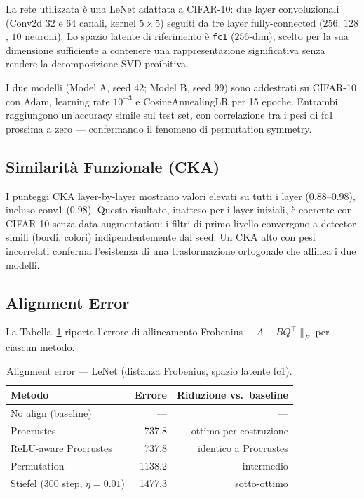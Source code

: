 \documentclass[11pt, a4paper]{article}
\begin{document}
La rete utilizzata è una LeNet adattata a CIFAR-10: due layer convoluzionali (Conv2d 32 e 64 canali, kernel $5\times5$) seguiti da tre layer fully-connected ($256$, $128$, $10$ neuroni). Lo spazio latente di riferimento è \texttt{fc1} ($256$-dim), scelto per la sua dimensione sufficiente a contenere una rappresentazione significativa senza rendere la decomposizione SVD proibitiva.

I due modelli (Model A, seed 42; Model B, seed 99) sono addestrati su CIFAR-10 con Adam, learning rate $10^{-3}$ e CosineAnnealingLR per 15 epoche. Entrambi raggiungono un'accuracy simile sul test set, con correlazione tra i pesi di fc1 prossima a zero — confermando il fenomeno di permutation symmetry.

\subsection{Similarità Funzionale (CKA)}

I punteggi CKA layer-by-layer mostrano valori elevati su tutti i layer ($0.88$–$0.98$), incluso conv1 ($0.98$). Questo risultato, inatteso per i layer iniziali, è coerente con CIFAR-10 senza data augmentation: i filtri di primo livello convergono a detector simili (bordi, colori) indipendentemente dal seed. Un CKA alto con pesi incorrelati conferma l'esistenza di una trasformazione ortogonale che allinea i due modelli.

\subsection{Alignment Error}

La Tabella~\ref{tab:lenet_align} riporta l'errore di allineamento Frobenius $\|A - BQ^\top\|_F$ per ciascun metodo.

\begin{table}[h!]
\centering
\caption{Alignment error — LeNet (distanza Frobenius, spazio latente fc1).}
\label{tab:lenet_align}
\begin{tabular}{lrr}
\toprule
\textbf{Metodo} & \textbf{Errore} & \textbf{Riduzione vs.\ baseline} \\
\midrule
No align (baseline) & — & — \\
Procrustes & 737.8 & ottimo per costruzione \\
ReLU-aware Procrustes & 737.8 & identico a Procrustes \\
Permutation & 1138.2 & intermedio \\
Stiefel (300 step, $\eta=0.01$) & 1477.3 & sotto-ottimo \\
\bottomrule
\end{tabular}
\end{table}
\end{document}
